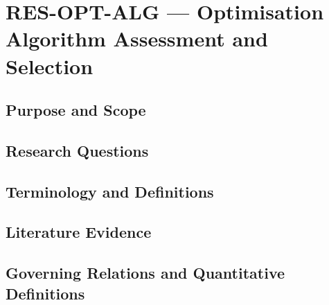 
\section{RES-OPT-ALG --- Optimisation Algorithm Assessment and Selection}
\label{sec:res-opt-alg}

\subsection{Purpose and Scope}
\label{sec:res-opt-alg-purpose}


\subsection{Research Questions}
\label{sec:res-opt-alg-research-questions}


\subsection{Terminology and Definitions}
\label{sec:res-opt-alg-definitions}


\subsection{Literature Evidence}
\label{sec:res-opt-alg-literature-evidence}

%

\subsection{Governing Relations and Quantitative Definitions}
\label{sec:res-opt-alg-governing-relations}

